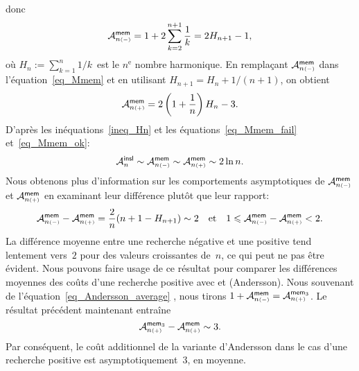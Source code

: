 donc
\begin{equation}
\abovedisplayskip=-6pt
\abovedisplayshortskip=-6pt
\M{\fun{mem}}{n{\scriptscriptstyle (-)}} =
1 + 2 \sum_{k=2}^{n+1}\frac{1}{k} = 2H_{n+1} - 1,
\index{mem@$\M{\fun{mem}}{n{\scriptscriptstyle (-)}}$}
\label{eq_Mmem_fail}
\end{equation}
où \(H_n := \sum_{k=1}^{n}1/k\)~est le \(n^\text{e}\) nombre
harmonique. En remplaçant
\(\M{\fun{mem}}{n{\scriptscriptstyle (-)}}\) dans
l'équation~\eqref{eq_Mmem} et en utilisant \(H_{n+1} = H_n +
1/(n+1)\), on obtient
\begin{equation}
\M{\fun{mem}}{n{\scriptscriptstyle (+)}} =
2\left(1+\frac{1}{n}\right)H_n - 3.
\index{mem@$\M{\fun{mem}}{n{\scriptscriptstyle (+)}}$}
\label{eq_Mmem_ok}
\end{equation}
D'après les inéquations~\eqref{ineq_Hn}  et
les équations~\eqref{eq_Mmem_fail} et~\eqref{eq_Mmem_ok}:
\begin{equation*}
\M{\fun{insl}}{n}
\sim \M{\fun{mem}}{n{\scriptscriptstyle (-)}}
\sim \M{\fun{mem}}{n{\scriptscriptstyle (+)}} \sim 2 \ln n.
\end{equation*}
Nous obtenons plus d'information sur les comportements asymptotiques
de \(\M{\fun{mem}}{n{\scriptscriptstyle(-)}}\) et
\(\M{\fun{mem}}{n{\scriptscriptstyle(+)}}\) en examinant leur
différence plutôt que leur rapport:
\begin{equation*}
\M{\fun{mem}}{n{\scriptscriptstyle (-)}} -
\M{\fun{mem}}{n{\scriptscriptstyle (+)}} = 
\frac{2}{n}(n + 1 - H_{n+1}) \sim 2
\quad\text{et}\quad
1 \leqslant \M{\fun{mem}}{n{\scriptscriptstyle (-)}} -
\M{\fun{mem}}{n{\scriptscriptstyle (+)}} < 2.
\end{equation*}
La différence moyenne entre une recherche négative et une positive
tend lentement vers~\(2\) pour des valeurs croissantes de~\(n\), ce
qui peut ne pas être évident. Nous pouvons faire usage de ce résultat
pour comparer les différences moyennes des coûts d'une recherche
positive avec  et  (Andersson). Nous
souvenant de l'équation~\eqref{eq_Andersson_average}
, nous tirons \(1 +
\M{\fun{mem}}{n{\scriptscriptstyle (-)}} =
\M{\fun{mem}_3}{n{\scriptscriptstyle (+)}}\). Le résultat précédent
maintenant entraîne
\begin{equation*}
  \M{\fun{mem}_3}{n{\scriptscriptstyle (+)}} -
  \M{\fun{mem}}{n{\scriptscriptstyle (+)}} \sim 3.
\index{mem3@$\M{\fun{mem}_3}{n{\scriptscriptstyle (+)}}$}
\end{equation*}
Par conséquent, le coût additionnel de la variante d'Andersson dans le
cas d'une recherche positive est asymptotiquement~\(3\), en moyenne.

